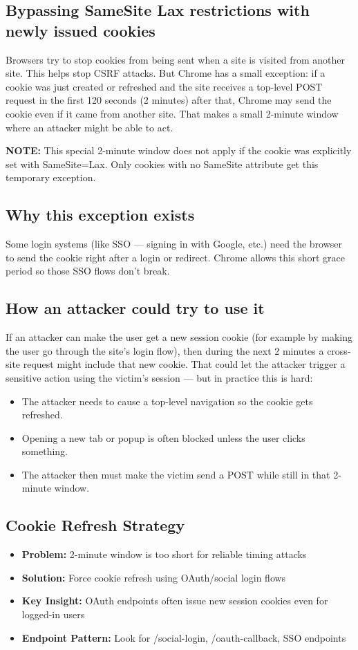 \documentclass{article}
\begin{document}
\subsection*{Bypassing SameSite Lax restrictions with newly issued cookies}
Browsers try to stop cookies from being sent when a site is visited from another site. This helps stop CSRF attacks. But Chrome has a small exception: if a cookie was just created or refreshed and the site receives a top-level POST request in the first 120 seconds (2 minutes) after that, Chrome may send the cookie even if it came from another site. That makes a small 2-minute window where an attacker might be able to act.

\textbf{NOTE:} This special 2-minute window does not apply if the cookie was explicitly set with SameSite=Lax. Only cookies with no SameSite attribute get this temporary exception.

\subsection*{Why this exception exists}
Some login systems (like SSO — signing in with Google, etc.) need the browser to send the cookie right after a login or redirect. Chrome allows this short grace period so those SSO flows don’t break.

\subsection*{How an attacker could try to use it}
If an attacker can make the user get a new session cookie (for example by making the user go through the site’s login flow), then during the next 2 minutes a cross-site request might include that new cookie. That could let the attacker trigger a sensitive action using the victim’s session — but in practice this is hard:

\begin{itemize}
\item The attacker needs to cause a top-level navigation so the cookie gets refreshed.
\item Opening a new tab or popup is often blocked unless the user clicks something.
\item The attacker then must make the victim send a POST while still in that 2-minute window.
\end{itemize}

\subsection*{Cookie Refresh Strategy}
\begin{itemize}
\item \textbf{Problem:} 2-minute window is too short for reliable timing attacks
\item \textbf{Solution:} Force cookie refresh using OAuth/social login flows
\item \textbf{Key Insight:} OAuth endpoints often issue new session cookies even for logged-in users
\item \textbf{Endpoint Pattern:} Look for /social-login, /oauth-callback, SSO endpoints
\end{itemize}
\end{document}
